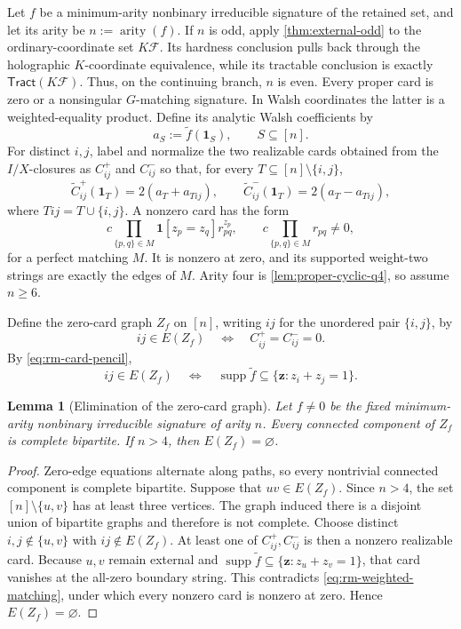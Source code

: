 \documentclass[11pt,letterpaper,onecolumn]{article}
\theoremstyle{plain}
\newtheorem{lemma}[lemma]{Lemma}
\theoremstyle{definition}
\theoremstyle{remark}
\newcommand{\cF}{\mathcal F}
\newcommand{\Tract}{\mathsf{Tract}}
\newcommand{\supp}{\operatorname{supp}}
\newcommand{\arity}{\operatorname{arity}}
\newcommand{\one}{\mathbf 1}
\begin{document}
Let \(f\) be a minimum-arity nonbinary irreducible signature of the retained set,
and let its arity be \(n:=\arity(f)\).  If \(n\) is odd, apply
\cref{thm:external-odd} to the ordinary-coordinate set \(K\cF\).  Its
hardness conclusion pulls back through the holographic \(K\)-coordinate
equivalence, while its tractable conclusion is exactly \(\Tract(K\cF)\).
Thus, on the continuing branch, \(n\) is even.  Every
proper card is zero or a nonsingular \(G\)-matching signature. In Walsh
coordinates the latter is a weighted-equality product.  Define its analytic
Walsh coefficients by
\[
  a_S:=\widetilde f(\one_S),
  \qquad S\subseteq[n].
\]
For distinct \(i,j\), label and normalize the two realizable cards obtained
from the \(I/X\)-closures as \(C_{ij}^{+}\) and \(C_{ij}^{-}\) so that,
for every \(T\subseteq[n]\setminus\{i,j\}\),
\begin{equation}
  \widetilde C_{ij}^{+}(\one_T)=2(a_T+a_{Tij}),
  \qquad
  \widetilde C_{ij}^{-}(\one_T)=2(a_T-a_{Tij}),
  \label{eq:rm-card-pencil}
\end{equation}
where \(Tij=T\cup\{i,j\}\).  A nonzero card has the form
\begin{equation}
  c\prod_{\{p,q\}\in M}
  \one[z_p=z_q]r_{pq}^{z_p},
  \qquad c\prod_{\{p,q\}\in M}r_{pq}\ne0,
  \label{eq:rm-weighted-matching}
\end{equation}
for a perfect matching \(M\). It is nonzero at zero, and its supported
weight-two strings are exactly the edges of \(M\).  Arity four is
\cref{lem:proper-cyclic-q4}, so assume \(n\ge6\).

Define the zero-card graph \(Z_f\) on \([n]\), writing \(ij\) for the
unordered pair \(\{i,j\}\), by
\[
  ij\in E(Z_f)
  \quad\Longleftrightarrow\quad
  C_{ij}^{+}=C_{ij}^{-}=0.
\]
By \cref{eq:rm-card-pencil},
\begin{equation*}
  ij\in E(Z_f)
  \quad\Longleftrightarrow\quad
  \supp\widetilde f\subseteq\{{\mathbf z}:z_i+z_j=1\}.
\end{equation*}

\begin{lemma}[Elimination of the zero-card graph]
\label{lem:rm-zero-graph}
\label{lem:rm-no-zero-edge}
Let \(f\ne0\) be the fixed minimum-arity nonbinary irreducible signature of arity \(n\).  Every connected
component of \(Z_f\) is complete bipartite.  If \(n>4\), then
\(E(Z_f)=\varnothing\).
\end{lemma}

\begin{proof}
Zero-edge equations alternate along paths, so every nontrivial connected
component is complete bipartite.  Suppose that \(uv\in E(Z_f)\).  Since
\(n>4\), the set \([n]\setminus\{u,v\}\) has at least three vertices.  The
graph induced there is a disjoint union of bipartite graphs and therefore
is not complete. Choose distinct \(i,j\notin\{u,v\}\) with
\(ij\notin E(Z_f)\).  At least one of \(C_{ij}^{+},C_{ij}^{-}\) is then a
nonzero realizable card.  Because \(u,v\) remain external and
\(\supp\widetilde f\subseteq\{{\mathbf z}:z_u+z_v=1\}\), that card vanishes at the
all-zero boundary string.  This contradicts \cref{eq:rm-weighted-matching},
under which every nonzero card is nonzero at zero.  Hence
\(E(Z_f)=\varnothing\).
\end{proof}
\end{document}
